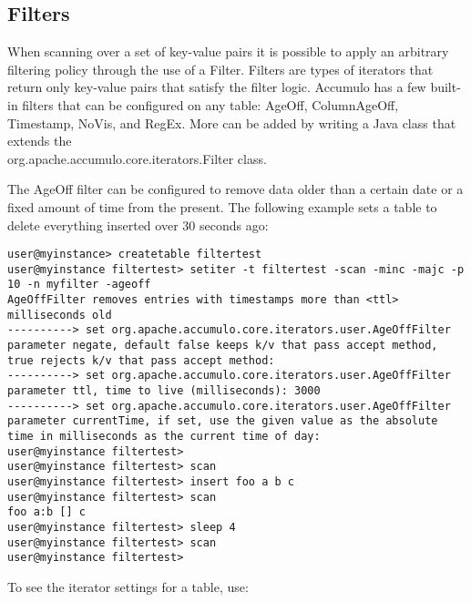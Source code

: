 \subsection{Filters}
When scanning over a set of key-value pairs it is possible to apply an arbitrary
filtering policy through the use of a Filter. Filters are types of iterators that return
only key-value pairs that satisfy the filter logic. Accumulo has a few built-in filters
that can be configured on any table: AgeOff, ColumnAgeOff, Timestamp, NoVis, and RegEx. More can be added
by writing a Java class that extends the\\
org.apache.accumulo.core.iterators.Filter class.

The AgeOff filter can be configured to remove data older than a certain date or a fixed
amount of time from the present. The following example sets a table to delete
everything inserted over 30 seconds ago:

\small
\begin{verbatim}
user@myinstance> createtable filtertest
user@myinstance filtertest> setiter -t filtertest -scan -minc -majc -p 10 -n myfilter -ageoff
AgeOffFilter removes entries with timestamps more than <ttl> milliseconds old
----------> set org.apache.accumulo.core.iterators.user.AgeOffFilter parameter negate, default false keeps k/v that pass accept method, true rejects k/v that pass accept method: 
----------> set org.apache.accumulo.core.iterators.user.AgeOffFilter parameter ttl, time to live (milliseconds): 3000
----------> set org.apache.accumulo.core.iterators.user.AgeOffFilter parameter currentTime, if set, use the given value as the absolute time in milliseconds as the current time of day: 
user@myinstance filtertest> 
user@myinstance filtertest> scan
user@myinstance filtertest> insert foo a b c
user@myinstance filtertest> scan
foo a:b [] c
user@myinstance filtertest> sleep 4
user@myinstance filtertest> scan
user@myinstance filtertest>
\end{verbatim}
\normalsize

To see the iterator settings for a table, use:

